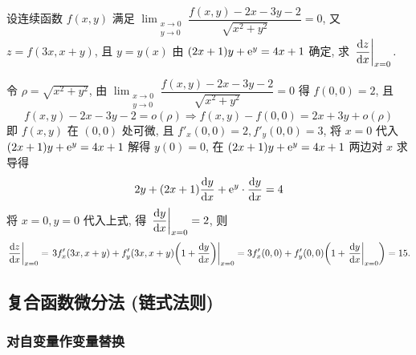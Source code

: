 \begin{example}
    设连续函数 $f(x,y)$ 满足 $\displaystyle \lim_{\substack{x\to0\\ y\to0}}\dfrac{f(x,y)-2x-3y-2}{\sqrt{x^2+y^2}}=0$, 又 $z=f(3x,x+y)$, 且 $y=y(x)$ 由 $(2x+1)y+\mathrm{e} ^{y}=4x+1$ 确定, 求 $\eval{\dfrac{\dd z}{\dd x}}_{x=0}.$
\end{example}
\begin{solution}
    令 $\rho=\sqrt{x^2+y^2}$, 由 $\displaystyle \lim_{\substack{x\to0\\ y\to0}}\dfrac{f(x,y)-2x-3y-2}{\sqrt{x^2+y^2}}=0$ 得 $f(0,0)=2$, 且
    $$
        f(x,y)-2x-3y-2=o(\rho)\Rightarrow f(x,y)-f(0,0)=2x+3y+o(\rho)
    $$
    即 $f(x,y)$ 在 $(0,0)$ 处可微, 且 $f'_x(0,0)=2,f'_y(0,0)=3$, 将 $x=0$ 代入 $(2x+1)y+\mathrm{e} ^{y}=4x+1$ 解得 $y(0)=0$, 在 $(2x+1)y+\mathrm{e} ^{y}=4x+1$ 两边对 $x$ 求导得
    $$
        2y+(2x+1)\dv{y}{x}+\mathrm{e} ^{y}\cdot\dv{y}{x}=4
    $$
    将 $x=0,y=0$ 代入上式, 得 $\displaystyle \eval{\dv{y}{x}}_{x=0}=2$, 则
    $$
        \eval{\dv{z}{x}}_{x=0}=\eval{3f'_x(3x,x+y)+f'_y(3x,x+y)\qty(1+\dv{y}{x})}_{x=0}=3f'_x(0,0)+f'_y(0,0)\qty(1+\eval{\dv{y}{x}}_{x=0})=15.
    $$
\end{solution}

\subsection{复合函数微分法 (链式法则)}


\subsubsection{对自变量作变量替换}


